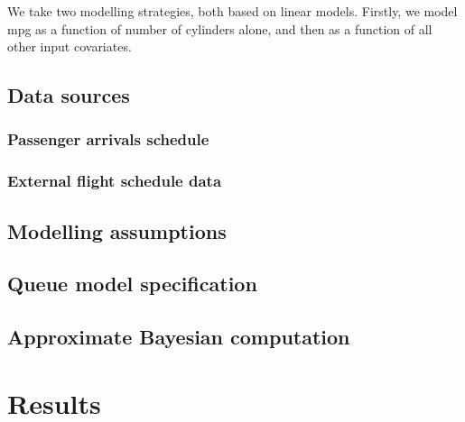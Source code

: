 \documentclass[12pt]{article}
\begin{document}


We take two modelling strategies, both based on linear models. Firstly, we model mpg as a function of number of cylinders alone, and then as a function of all other input covariates.

\subsection{Data sources}
\subsubsection{Passenger arrivals schedule}
\subsubsection{External flight schedule data}
\subsection{Modelling assumptions}

\subsection{Queue model specification}
\subsection{Approximate Bayesian computation}

\section{Results}
\end{document}

